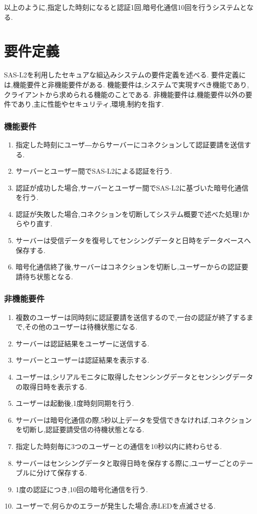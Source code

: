 以上のように,指定した時刻になると認証1回,暗号化通信10回を行うシステムとなる.

\section{要件定義}
SAS-L2を利用したセキュアな組込みシステムの要件定義を述べる.
要件定義には,機能要件と非機能要件がある.
機能要件は,システムで実現すべき機能であり,クライアントから求められる機能のことである.
非機能要件は,機能要件以外の要件であり,主に性能やセキュリティ,環境,制約を指す.
\subsubsection{機能要件}
\begin{enumerate}
	\item 指定した時刻にユーザ―からサーバーにコネクションして認証要請を送信する.
	\item サーバーとユーザー間でSAS-L2による認証を行う.
    \item 認証が成功した場合,サーバーとユーザー間でSAS-L2に基づいた暗号化通信を行う.
    \item 認証が失敗した場合,コネクションを切断してシステム概要で述べた処理1からやり直す.
	\item サーバーは受信データを復号してセンシングデータと日時をデータベースへ保存する.
    \item 暗号化通信終了後,サーバーはコネクションを切断し,ユーザーからの認証要請待ち状態となる.
\end{enumerate} 

\subsubsection{非機能要件}
\begin{enumerate}
    \item 複数のユーザーは同時刻に認証要請を送信するので,一台の認証が終了するまで,その他のユーザーは待機状態になる.
    \item サーバーは認証結果をユーザーに送信する.
    \item サーバーとユーザーは認証結果を表示する.
    \item ユーザーは,シリアルモニタに取得したセンシングデータとセンシングデータの取得日時を表示する.
    \item ユーザーは起動後,1度時刻同期を行う.
    \item サーバーは暗号化通信の際,5秒以上データを受信できなければ,コネクションを切断し,認証要請受信の待機状態となる.
	\item 指定した時刻毎に3つのユーザーとの通信を10秒以内に終わらせる.
    \item サーバーはセンシングデータと取得日時を保存する際に,ユーザーごとのテーブルに分けて保存する.
    \item 1度の認証につき,10回の暗号化通信を行う.
	\item ユーザーで,何らかのエラーが発生した場合,赤LEDを点滅させる.
\end{enumerate} 
